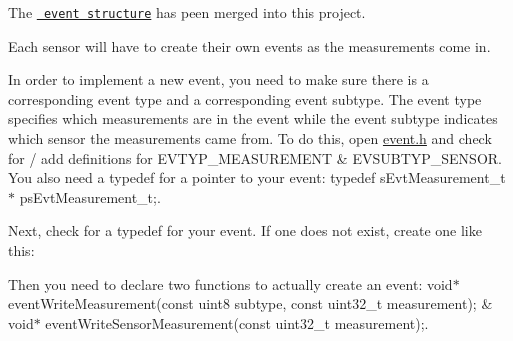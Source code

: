 The \href{https://code.fbi.h-da.de/pse_mayer_ss19/trunk/tree/master/Allgemein/Beispiele/CY8Ckit-149-BLE/I2C_Event.cydsn}{\texttt{ event structure}} has peen merged into this project.

Each sensor will have to create their own events as the measurements come in.

In order to implement a new event, you need to make sure there is a corresponding event type and a corresponding event subtype. The event type specifies which measurements are in the event while the event subtype indicates which sensor the measurements came from. To do this, open {\ttfamily \mbox{\hyperlink{event_8h_source}{event.\+h}}} and check for / add definitions for {\ttfamily E\+V\+T\+Y\+P\+\_\+\+M\+E\+A\+S\+U\+R\+E\+M\+E\+NT} \& {\ttfamily E\+V\+S\+U\+B\+T\+Y\+P\+\_\+\+S\+E\+N\+S\+OR}. You also need a {\ttfamily typedef} for a pointer to your event\+: {\ttfamily typedef s\+Evt\+Measurement\+\_\+t$\ast$ ps\+Evt\+Measurement\+\_\+t;}.

Next, check for a {\ttfamily typedef} for your event. If one does not exist, create one like this\+:


\begin{DoxyCode}{0}
\end{DoxyCode}


Then you need to declare two functions to actually create an event\+: {\ttfamily void$\ast$ event\+Write\+Measurement(const uint8 subtype, const uint32\+\_\+t measurement);} \& {\ttfamily void$\ast$ event\+Write\+Sensor\+Measurement(const uint32\+\_\+t measurement);}.

